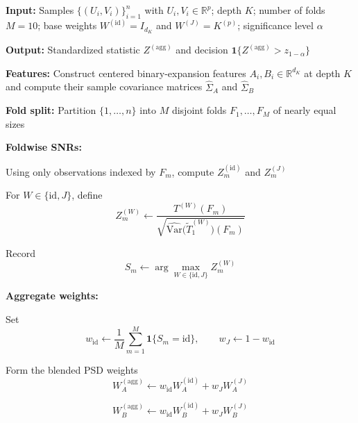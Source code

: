 \documentclass[12pt,reqno,oneside]{amsbook}
\theoremstyle{definition}
\theoremstyle{remark}
\begin{document}
\begin{algorithm}[htbp]
\caption{wa-dCoBET via 10-fold SNR voting}
\label{alg:wa-dcobet-compact}
\small

\begin{algorithmic}[1]

\State \textbf{Input:}
Samples $\{(U_i,V_i)\}_{i=1}^n$ with
$U_i,V_i\in\mathbb{R}^p$; depth $K$; number of folds $M=10$;
base weights
$W^{(\mathrm{id})}=I_{d_K}$ and
$W^{(J)}=K^{(p)}$; significance level $\alpha$

\State \textbf{Output:}
Standardized statistic $Z^{(\mathrm{agg})}$ and decision
$\mathbf{1}\{Z^{(\mathrm{agg})}>z_{1-\alpha}\}$

\Statex

\State \textbf{Features:}
Construct centered binary-expansion features
$A_i,B_i\in\mathbb{R}^{d_K}$ at depth $K$ and compute their
sample covariance matrices
$\widehat{\Sigma}_A$ and $\widehat{\Sigma}_B$

\Statex

\State \textbf{Fold split:}
Partition $\{1,\ldots,n\}$ into $M$ disjoint folds
$F_1,\ldots,F_M$ of nearly equal sizes

\Statex

\State \textbf{Foldwise SNRs:}


    \State Using only observations indexed by $F_m$, compute
    $Z_m^{(\mathrm{id})}$ and $Z_m^{(J)}$

    \State For $W\in\{\mathrm{id},J\}$, define
    \[
    Z_m^{(W)}
    \gets
    \frac{
        T^{(W)}(F_m)
    }{
        \sqrt{
            \widehat{\mathrm{Var}}
            \bigl(\widetilde{T}_1^{(W)}\bigr)(F_m)
        }
    }
    \]

    \State Record
    \[
    S_m
    \gets
    \arg\max_{W\in\{\mathrm{id},J\}}
    Z_m^{(W)}
    \]

\EndFor

\Statex

\State \textbf{Aggregate weights:}

\State Set
\[
w_{\mathrm{id}}
\gets
\frac{1}{M}
\sum_{m=1}^{M}
\mathbf{1}\{S_m=\mathrm{id}\},
\qquad
w_J\gets 1-w_{\mathrm{id}}
\]

\State Form the blended PSD weights
\[
W_A^{(\mathrm{agg})}
\gets
w_{\mathrm{id}}W_A^{(\mathrm{id})}
+
w_JW_A^{(J)}
\]

\State
\[
W_B^{(\mathrm{agg})}
\gets
w_{\mathrm{id}}W_B^{(\mathrm{id})}
+
w_JW_B^{(J)}
\]


\end{algorithmic}
\end{algorithm}
\end{document}
